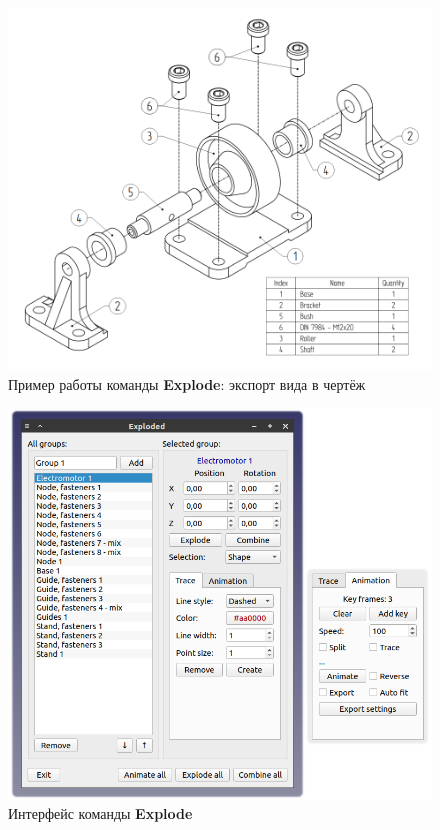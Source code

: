 \documentclass[a4paper,12pt]{article}
\begin{document}
\begin{figure}[htp]
	\centering
	\includegraphics[scale=0.42]{img/exploded_d_result.png}
	\caption{Пример работы команды \textbf{Explode}: экспорт вида в чертёж}
	\label{sec:exploded_d_result}
\end{figure}

\pagebreak

\begin{figure}[htp]
	\centering
	\includegraphics[width=1\textwidth]{img/exploded.png}
	\caption{Интерфейс команды \textbf{Explode}}
	\label{sec:exploded}
\end{figure}
\end{document}

